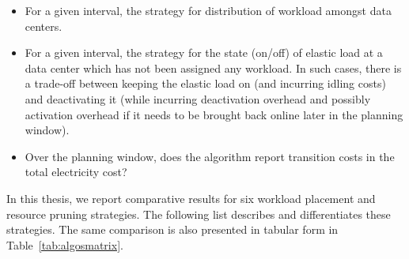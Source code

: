 \begin{itemize}
\item For a given interval, the strategy for distribution of workload amongst data centers.
\item For a given interval, the strategy for the state (on/off) of elastic load at a data center which has not been assigned any workload. In such cases, there is a trade-off between keeping the elastic load on (and incurring idling costs) and deactivating it (while incurring deactivation overhead and possibly activation overhead if it needs to be brought back online later in the planning window).
\item Over the planning window, does the algorithm report transition costs in the total electricity cost?
\end{itemize}

In this thesis, we report comparative results for six workload placement and resource pruning strategies.%
 The following list describes and differentiates these strategies. The same comparison is also presented in tabular form in Table~\ref{tab:algosmatrix}.

